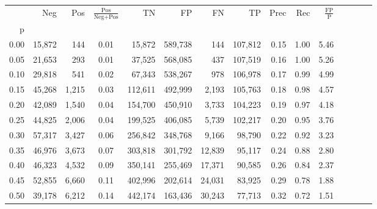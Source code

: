 \begin{tabular}{rrrcrrrrrrrrrrr}
\toprule
{} &     Neg &    Pos & $\frac{\text{Pos}}{\text{Neg}+\text{Pos}}$ &       TN &       FP &       FN &       TP &  Prec &   Rec & $\frac{\text{FP}}{\text{P}}$ \\
p    &         &        &                                            &          &          &          &          &       &       &                              \\
\midrule
0.00 &  15,872 &    144 &                                       0.01 &   15,872 &  589,738 &      144 &  107,812 &  0.15 &  1.00 &                         5.46 \\
0.05 &  21,653 &    293 &                                       0.01 &   37,525 &  568,085 &      437 &  107,519 &  0.16 &  1.00 &                         5.26 \\
0.10 &  29,818 &    541 &                                       0.02 &   67,343 &  538,267 &      978 &  106,978 &  0.17 &  0.99 &                         4.99 \\
0.15 &  45,268 &  1,215 &                                       0.03 &  112,611 &  492,999 &    2,193 &  105,763 &  0.18 &  0.98 &                         4.57 \\
0.20 &  42,089 &  1,540 &                                       0.04 &  154,700 &  450,910 &    3,733 &  104,223 &  0.19 &  0.97 &                         4.18 \\
0.25 &  44,825 &  2,006 &                                       0.04 &  199,525 &  406,085 &    5,739 &  102,217 &  0.20 &  0.95 &                         3.76 \\
0.30 &  57,317 &  3,427 &                                       0.06 &  256,842 &  348,768 &    9,166 &   98,790 &  0.22 &  0.92 &                         3.23 \\
0.35 &  46,976 &  3,673 &                                       0.07 &  303,818 &  301,792 &   12,839 &   95,117 &  0.24 &  0.88 &                         2.80 \\
0.40 &  46,323 &  4,532 &                                       0.09 &  350,141 &  255,469 &   17,371 &   90,585 &  0.26 &  0.84 &                         2.37 \\
0.45 &  52,855 &  6,660 &                                       0.11 &  402,996 &  202,614 &   24,031 &   83,925 &  0.29 &  0.78 &                         1.88 \\
0.50 &  39,178 &  6,212 &                                       0.14 &  442,174 &  163,436 &   30,243 &   77,713 &  0.32 &  0.72 &                         1.51 \\

\end{tabular}
